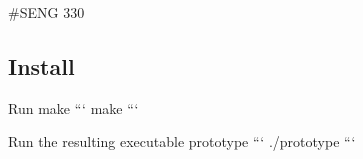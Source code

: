 \#\+S\+E\+NG 330

\subsection*{Install}


\begin{DoxyEnumerate}
\item Run make ``` make ```
\item Run the resulting executable \textquotesingle{}prototype\textquotesingle{} ``` ./prototype ``` 
\end{DoxyEnumerate}